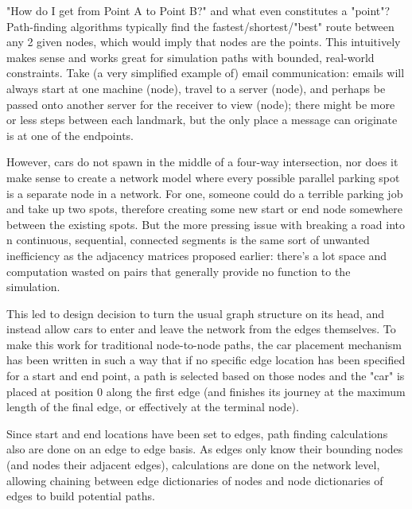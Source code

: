\par "How do I get from Point A to Point B?" and what even constitutes a "point"?  Path-finding algorithms typically find the fastest/shortest/"best" route between any 2 given nodes, which would imply that nodes are the points. This intuitively makes sense and works great for simulation paths with bounded, real-world constraints.  Take (a very simplified example of) email communication:  emails will always start at one machine (node), travel to a server (node), and perhaps be passed onto another server for the receiver to view (node); there might be more or less steps between each landmark, but the only place a message can originate is at one of the endpoints.  \\

\par However, cars do not spawn in the middle of a four-way intersection, nor does it make sense to create a network model where every possible parallel parking spot is a separate node in a network.  For one, someone could do a terrible parking job and take up two spots, therefore creating some new start or end node somewhere between the existing spots.  But the more pressing issue with breaking a road into n continuous, sequential, connected segments is the same sort of unwanted inefficiency as the adjacency matrices proposed earlier:  there's a lot space and computation wasted on pairs that generally provide no function to the simulation. \\

\par This led to design decision to turn the usual graph structure on its head, and instead allow cars to enter and leave the network from the edges themselves.  To make this work for traditional node-to-node paths, the car placement mechanism has been written in such a way that if no specific edge location has been specified for a start and end point, a path is selected based on those nodes and the "car" is placed at position 0 along the first edge (and finishes its journey at the maximum length of the final edge, or effectively at the terminal node). \\

\par Since start and end locations have been set to edges, path finding calculations also are done on an edge to edge basis.  As edges only know their bounding nodes (and nodes their adjacent edges), calculations are done on the network level, allowing chaining between edge dictionaries of nodes and node dictionaries of edges to build potential paths.


